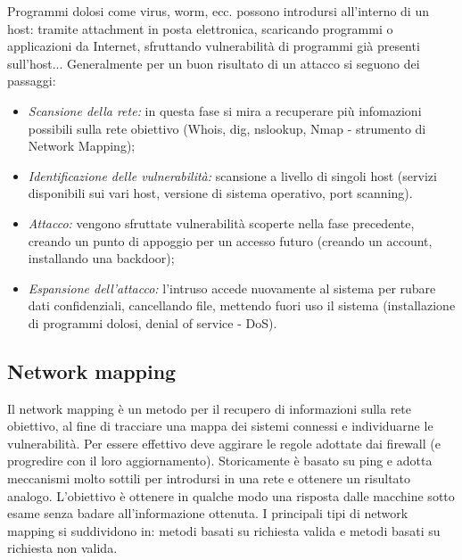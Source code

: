Programmi dolosi come virus, worm, ecc. possono introdursi all’interno di un host: tramite attachment in posta elettronica, scaricando programmi o applicazioni da Internet, sfruttando vulnerabilità di programmi già presenti sull’host... Generalmente per un buon risultato di un attacco si seguono dei passaggi:
\begin{itemize}
    \item \textit{Scansione della rete:} in questa fase si mira a recuperare più infomazioni possibili sulla rete obiettivo (Whois, dig, nslookup, Nmap - strumento di Network Mapping);
    \item \textit{Identificazione delle vulnerabilità:} scansione a livello di singoli host (servizi disponibili sui vari host, versione di sistema operativo, port scanning).
    \item \textit{Attacco:} vengono sfruttate vulnerabilità scoperte nella fase precedente, creando un punto di appoggio per un accesso futuro (creando un account, installando una backdoor);
    \item \textit{Espansione dell’attacco:} l’intruso accede nuovamente al sistema per rubare dati confidenziali, cancellando file, mettendo fuori uso il sistema (installazione di programmi dolosi, denial of service - DoS).
\end{itemize}

\subsection{Network mapping}
Il network mapping è un metodo per il recupero di informazioni sulla rete obiettivo, al fine di tracciare una mappa dei sistemi connessi e individuarne le vulnerabilità. Per essere effettivo deve aggirare le regole adottate dai firewall (e progredire con il loro aggiornamento). Storicamente è basato su ping e adotta meccanismi molto sottili per introdursi in una rete e ottenere un risultato analogo. L'obiettivo è ottenere in qualche modo una risposta dalle macchine sotto esame senza badare all’informazione ottenuta. I principali tipi di network mapping si suddividono in: metodi basati su richiesta valida e metodi basati su richiesta non valida.

